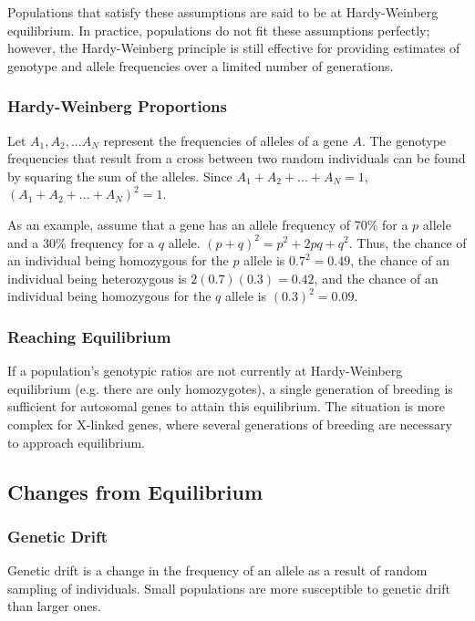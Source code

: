 \documentclass[12pt,titlepage]{article}
\begin{document}
        Populations that satisfy these assumptions are said to be at Hardy-Weinberg equilibrium. In practice, populations do not fit these assumptions
        perfectly; however, the Hardy-Weinberg principle is still effective for providing estimates of genotype and allele frequencies over a limited
        number of generations.

      \subsubsection{Hardy-Weinberg Proportions}
        Let $A_1, A_2, ... A_N$ represent the frequencies of alleles of a gene $A$. The genotype frequencies that result from a cross between two random
        individuals can be found by squaring the sum of the alleles. Since $A_1 + A_2 + ... + A_N = 1$, $(A_1 + A_2 + ... + A_N)^2 = 1$.

        As an example, assume that a gene has an allele frequency of 70\% for a $p$ allele and a 30\% frequency for a $q$ allele. $(p + q)^2 = p^2 + 2pq + q^2$.
        Thus, the chance of an individual being homozygous for the $p$ allele is $0.7^2 = 0.49$, the chance of an individual being heterozygous is
        $2(0.7)(0.3) = 0.42$, and the chance of an individual being homozygous for the $q$ allele is $(0.3)^2 = 0.09$.

      \subsubsection{Reaching Equilibrium}
        If a population's genotypic ratios are not currently at Hardy-Weinberg equilibrium (e.g. there are only homozygotes), a single generation of breeding
        is sufficient for autosomal genes to attain this equilibrium. The situation is more complex for X-linked genes, where several generations of breeding
        are necessary to approach equilibrium.

    \subsection{Changes from Equilibrium}

      \subsubsection{Genetic Drift}
        Genetic drift is a change in the frequency of an allele as a result of random sampling of individuals. Small populations are more susceptible to
        genetic drift than larger ones.
\end{document}
